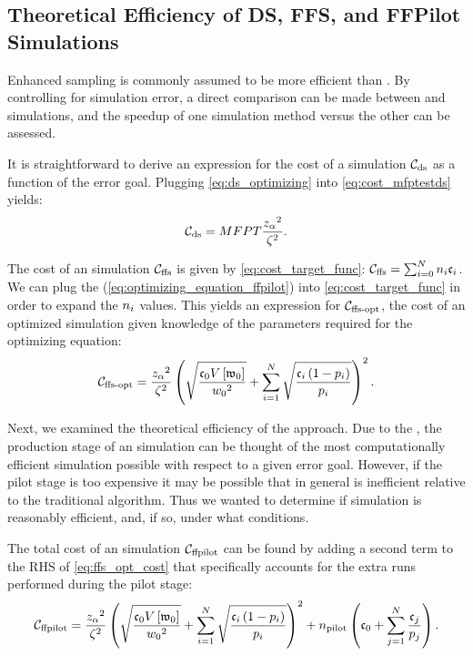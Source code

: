 \subsection{Theoretical Efficiency of DS, FFS, and FFPilot Simulations}
\label{sec:efficiency}

Enhanced sampling is commonly assumed to be more efficient than . By controlling for simulation error, a direct comparison can be made between  and  simulations, and the speedup of one simulation method versus the other can be assessed.

It is straightforward to derive an expression for the cost of a  simulation ${\mathcal{C}}_{\textrm{ds}}$ as a function of the error goal. Plugging \eqref{eq:ds_optimizing} into \eqref{eq:cost_mfptestds} yields:
    \begin{equation}
       \label{eq:ds_cost}
        {\mathcal{C}}_{\textrm{ds}} = MFPT \frac{z_{\alpha} {}^2}{\zeta {}^2}.
    \end{equation}

The cost of an  simulation ${\mathcal{C}}_{\textrm{ffs}}$ is given by \eqref{eq:cost_target_func}: ${\mathcal{C}}_{\textrm{ffs}} = \sum_{i=0}^{N} n_{i} \mathfrak{c}_{i}$. We can plug the \opteq{} (\eqref{eq:optimizing_equation_ffpilot}) into \eqref{eq:cost_target_func} in order to expand the $n_{i}$ values. This yields an expression for ${\mathcal{C}}_{\textrm{ffs-opt}}$, the cost of an optimized  simulation given \apriori knowledge of the parameters required for the optimizing equation:
    \begin{equation}
        \label{eq:ffs_opt_cost}
        {\mathcal{C}}_{\textrm{ffs-opt}} = \frac{z_{\alpha} {}^2}{\zeta {}^2} \left(\sqrt{\frac{\mathfrak{c}_{0} V \left[ \mathfrak{w}_{0} \right]}{w_{0} {}^2}} + \sum_{i=1}^N \sqrt{\frac{\mathfrak{c}_{i} \left( 1-p_{i} \right)}{p_{i}}} \right)^2.
    \end{equation}

Next, we examined the theoretical efficiency of the  approach. Due to the \opteq{}, the production stage of an  simulation can be thought of the most computationally efficient  simulation possible with respect to a given error goal. However, if the pilot stage is too expensive it may be possible that in general  is inefficient relative to the traditional  algorithm. Thus we wanted to determine if  simulation is reasonably efficient, and, if so, under what conditions.

The total cost of an  simulation ${\mathcal{C}}_{\textrm{ffpilot}}$ can be found by adding a second term to the RHS of \eqref{eq:ffs_opt_cost} that specifically accounts for the extra runs performed during the pilot stage:
    \begin{equation}
    \label{eq:ffpilot_cost}
        {\mathcal{C}}_{\textrm{ffpilot}} = \frac{z_{\alpha} {}^2}{\zeta {}^2}\left(\sqrt{\frac{\mathfrak{c}_{0} V \left[ \mathfrak{w}_{0} \right]}{w_{0} {}^2}} + \sum_{i=1}^N \sqrt{\frac{\mathfrak{c}_{i} \left( 1-p_{i} \right)}{p_{i}}} \right)^2 + n_{\textrm{pilot}} \left( \mathfrak{c}_{0} + \sum _{j=1}^N \frac{\mathfrak{c}_{j}}{p_{j}} \right).
    \end{equation}


